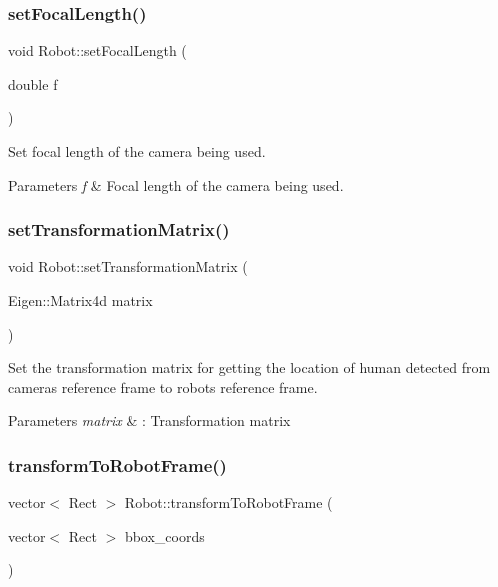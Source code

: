 \subsubsection{\texorpdfstring{set\+Focal\+Length()}{setFocalLength()}}
{\footnotesize\ttfamily void Robot\+::set\+Focal\+Length (\begin{DoxyParamCaption}\item[{double}]{f }\end{DoxyParamCaption})}



Set focal length of the camera being used. 


\begin{DoxyParams}{Parameters}
{\em f} & Focal length of the camera being used. \\
\hline
\end{DoxyParams}
\mbox{\label{classRobot_a2362bcfbd845f451a278b3d6af907f1f}} 
\subsubsection{\texorpdfstring{set\+Transformation\+Matrix()}{setTransformationMatrix()}}
{\footnotesize\ttfamily void Robot\+::set\+Transformation\+Matrix (\begin{DoxyParamCaption}\item[{Eigen\+::\+Matrix4d}]{matrix }\end{DoxyParamCaption})}



Set the transformation matrix for getting the location of human detected from camera\textquotesingle{}s reference frame to robot\textquotesingle{}s reference frame. 


\begin{DoxyParams}{Parameters}
{\em matrix} & \+: Transformation matrix \\
\hline
\end{DoxyParams}
\mbox{\label{classRobot_a090b8f765b5d83a322576fb9d48bb14e}} 
\subsubsection{\texorpdfstring{transform\+To\+Robot\+Frame()}{transformToRobotFrame()}}
{\footnotesize\ttfamily vector$<$ Rect $>$ Robot\+::transform\+To\+Robot\+Frame (\begin{DoxyParamCaption}\item[{vector$<$ Rect $>$}]{bbox\+\_\+coords }\end{DoxyParamCaption})}



